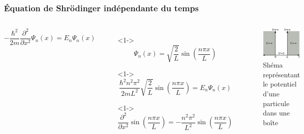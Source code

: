 \documentclass[aspectratio=169]{beamer}
\begin{document}
\begin{frame}
\frametitle{Équation de Shrödinger indépendante du temps}

\begin{columns}

\begin{equation}\tag{4}
-\frac{\hbar^2}{2m}\frac{\partial^2}{\partial x^2}\Psi_n(x)=E_n\Psi_n(x)
\end{equation} 

\begin{itemize}
\item[]<1-> \begin{equation}\tag{5}
\Psi_n(x)=\sqrt{\frac{2}{L}}\sin(\frac{n\pi x}{L})
\end{equation}  
\item[]<1-> \begin{equation}\tag{6}
\frac{\hbar^2n^2\pi^2}{2mL^2}   \sqrt{\frac{2}{L}}  \sin(\frac{n\pi x}{L})=E_n\Psi_n(x)
\end{equation}  

\item[]<1-> \begin{equation}\tag{7}
\frac{\partial^2}{\partial x^2}\sin(\frac{n\pi x}{L})=-\frac{n^2\pi^2}{L^2}\sin(\frac{n\pi x}{L})
\end{equation} 

\end{itemize}
\begin{figure}
\includegraphics[scale=0.4]{Pot}
\caption{Shéma représentant le potentiel d'une particule dans une boîte}
\end{figure}
\end{columns}

\end{frame}
\end{document}
